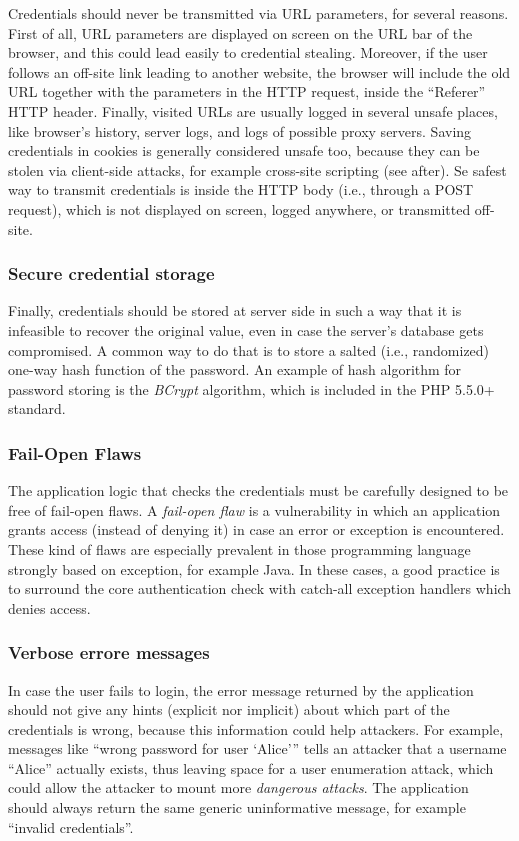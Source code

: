 \documentclass[a4paper,12pt]{article}
\begin{document}
Credentials should never be transmitted via URL parameters, for several reasons. First of all, URL parameters are displayed on screen on the URL bar of the browser, and this could lead easily to credential stealing. Moreover, if the user follows an off-site link leading to another website, the browser will include the old URL together with the parameters in the HTTP request, inside the “Referer” HTTP header. Finally, visited URLs are usually logged in several unsafe places, like browser’s history, server logs, and logs of possible proxy servers. Saving credentials in cookies is generally considered unsafe too, because they can be stolen via client-side attacks, for example cross-site scripting (see after). Se safest way to transmit credentials is inside the HTTP body (i.e., through a POST request), which is not displayed on screen, logged anywhere, or transmitted off-site.

\subsubsection{Secure credential storage}
Finally, credentials should be stored at server side in such a way that it is infeasible to recover the original value, even in case the server’s database gets compromised. A common way to do that is to store a salted (i.e., randomized) one-way hash function of the password. An example of hash algorithm for password storing is the \textit{BCrypt} algorithm, which is included in the PHP 5.5.0+ standard.

\subsubsection{Fail-Open Flaws}
The application logic that checks the credentials must be carefully designed to be free of fail-open flaws. A \textit{fail-open flaw} is a vulnerability in which an application grants access (instead of denying it) in case an error or exception is encountered. These kind of flaws are especially prevalent in those programming language strongly based on exception, for example Java. In these cases, a good practice is to surround the core authentication check with catch-all exception handlers which denies access.

\subsubsection{Verbose errore messages}
In case the user fails to login, the error message returned by the application should not give any hints (explicit nor implicit) about which part of the credentials is wrong, because this information could help attackers. For example, messages like “wrong password for user ‘Alice’” tells an attacker that a username “Alice” actually exists, thus leaving space for a user enumeration attack, which could allow the attacker to mount more \textit{dangerous attacks}. The application should always return the same generic uninformative message, for example “invalid credentials”.
\end{document}
